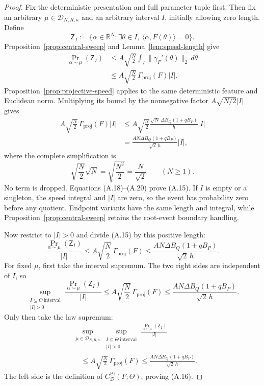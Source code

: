 \begin{proof}
Fix the deterministic presentation and full parameter tuple first.  Then fix
an arbitrary $\mu\in\mathcal D_{N,R,\kappa}$ and an arbitrary interval $I$,
initially allowing zero length.  Define
\[
\mathsf Z_I:=\{\alpha\in\mathbb R^N:\exists\theta\in I,
 \ \langle\alpha,F(\theta)\rangle=0\}.
\]
Proposition~\ref{prop:central-sweep} and
Lemma~\ref{lem:speed-length} give
\[
\begin{aligned}
\Pr_{\alpha\sim\mu}(\mathsf Z_I)
&\leq A\sqrt{\frac N2}
 \int_I\|\gamma_F'(\theta)\|_2\,d\theta\\
&\leq A\sqrt{\frac N2}\,
 \Gamma_{\mathrm{proj}}(F)|I|.
\end{aligned}
\tag{A.18}
\]
Proposition~\ref{prop:projective-speed} applies to the same deterministic
feature and Euclidean norm.  Multiplying its bound by the nonnegative factor
$A\sqrt{N/2}|I|$ gives
\[
\begin{aligned}
A\sqrt{\frac N2}\,\Gamma_{\mathrm{proj}}(F)|I|
&\leq A\sqrt{\frac N2}
 \frac{\sqrt N\,\Delta B_Q(1+qB_P)}h|I|\\
&=\frac{AN\Delta B_Q(1+qB_P)}{\sqrt2\,h}|I|,
\end{aligned}
\tag{A.19}
\]
where the complete simplification is
\[
\sqrt{\frac N2}\sqrt N
=\sqrt{\frac{N^2}{2}}
=\frac N{\sqrt2}
\qquad(N\geq1).
\tag{A.20}
\]
No term is dropped.  Equations (A.18)--(A.20) prove (A.15).  If $I$ is
empty or a singleton, the speed integral and $|I|$ are zero, so the event has
probability zero before any quotient.  Endpoint variants have the same
length and integral, while Proposition~\ref{prop:central-sweep} retains the
root-event boundary handling.

Now restrict to $|I|>0$ and divide (A.15) by this positive length:
\[
\frac{\Pr_{\alpha\sim\mu}(\mathsf Z_I)}{|I|}
\leq A\sqrt{\frac N2}\,\Gamma_{\mathrm{proj}}(F)
\leq\frac{AN\Delta B_Q(1+qB_P)}{\sqrt2\,h}.
\tag{A.21}
\]
For fixed $\mu$, first take the interval supremum.  The two right sides are
independent of $I$, so
\[
\sup_{\substack{I\subseteq\Theta\ \mathrm{interval}\\|I|>0}}
\frac{\Pr_{\alpha\sim\mu}(\mathsf Z_I)}{|I|}
\leq A\sqrt{\frac N2}\,\Gamma_{\mathrm{proj}}(F)
\leq\frac{AN\Delta B_Q(1+qB_P)}{\sqrt2\,h}.
\tag{A.22}
\]
Only then take the law supremum:
\[
\begin{aligned}
&\sup_{\mu\in\mathcal D_{N,R,\kappa}}
 \sup_{\substack{I\subseteq\Theta\ \mathrm{interval}\\|I|>0}}
 \frac{\Pr_{\alpha\sim\mu}(\mathsf Z_I)}{|I|}\\
&\quad\leq A\sqrt{\frac N2}\,\Gamma_{\mathrm{proj}}(F)
\leq\frac{AN\Delta B_Q(1+qB_P)}{\sqrt2\,h}.
\end{aligned}
\tag{A.23}
\]
The left side is the definition of
$C^{\mathrm{Pf}}_{\mathcal D}(F;\Theta)$, proving (A.16).


\end{proof}
